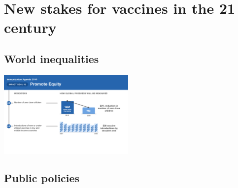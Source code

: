 \documentclass{article}
\begin{document}



        

    \section{New stakes for vaccines in the 21 century}

        \subsection{World inequalities}



        
        \begin{center}
            \includegraphics[width=0.5\textwidth]{imgs/IA2030_Scorecard_May23-3.png}
        \end{center}

        \subsection{Public policies}


                
\end{document}
